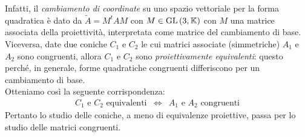 Infatti, il \textit{cambiamento di coordinate} su uno spazio vettoriale per la forma quadratica è dato da $\widetilde{A}=M^tAM$ con $M\in\operatorname{GL}\left(3,\mathbb{K}\right)$ con $M$ una matrice associata della proiettività, interpretata come matrice del cambiamento di base.\\
Viceversa, date due coniche $C_1$ e $C_2$ le cui matrici associate (simmetriche) $A_1$ e $A_2$ sono congruenti, allora $C_1$ e $C_2$ sono \textit{proiettivamente equivalenti}:  questo perché, in generale, forme quadratiche congruenti differiscono per un cambiamento di base.\\ Otteniamo così la seguente corrispondenza:
\begin{equation*}
\begin{array}{ccc}
C_1\text{ e }C_2\text{ equivalenti}& \iff & A_1\text{ e }A_2\text{ congruenti}
\end{array}
\end{equation*}
Pertanto lo studio delle coniche, a meno di equivalenze proiettive, passa per lo studio delle matrici congruenti.
